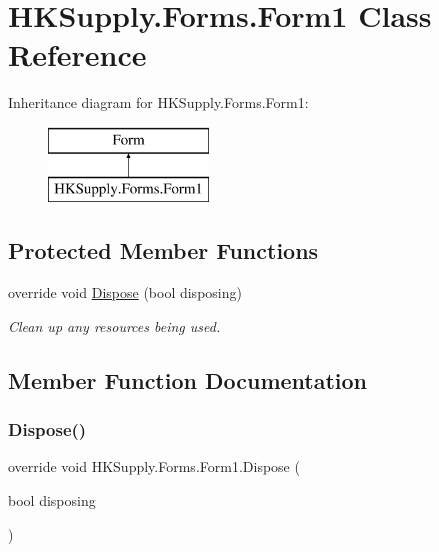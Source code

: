 \hypertarget{class_h_k_supply_1_1_forms_1_1_form1}{}\section{H\+K\+Supply.\+Forms.\+Form1 Class Reference}
\label{class_h_k_supply_1_1_forms_1_1_form1}
Inheritance diagram for H\+K\+Supply.\+Forms.\+Form1\+:\begin{figure}[H]
\begin{center}
\leavevmode
\includegraphics[height=2.000000cm]{class_h_k_supply_1_1_forms_1_1_form1}
\end{center}
\end{figure}
\subsection*{Protected Member Functions}
\begin{DoxyCompactItemize}
\item 
override void \mbox{\hyperlink{class_h_k_supply_1_1_forms_1_1_form1_a7263e1e5f0fb967269300f24f69a8bcf}{Dispose}} (bool disposing)
\begin{DoxyCompactList}\small\item\em Clean up any resources being used. \end{DoxyCompactList}\end{DoxyCompactItemize}


\subsection{Member Function Documentation}
\mbox{\label{class_h_k_supply_1_1_forms_1_1_form1_a7263e1e5f0fb967269300f24f69a8bcf}} 
\subsubsection{\texorpdfstring{Dispose()}{Dispose()}}
{\footnotesize\ttfamily override void H\+K\+Supply.\+Forms.\+Form1.\+Dispose (\begin{DoxyParamCaption}\item[{bool}]{disposing }\end{DoxyParamCaption})\hspace{0.3cm}{\ttfamily [protected]}}



